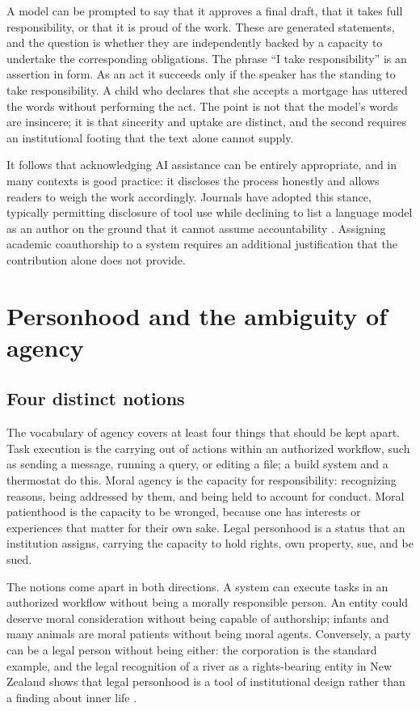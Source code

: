 \documentclass[11pt]{article}
\begin{document}
A model can be prompted to say that it approves a final draft, that it takes full responsibility, or that it is proud of the work. These are generated statements, and the question is whether they are independently backed by a capacity to undertake the corresponding obligations. The phrase ``I take responsibility'' is an assertion in form. As an act it succeeds only if the speaker has the standing to take responsibility. A child who declares that she accepts a mortgage has uttered the words without performing the act. The point is not that the model's words are insincere; it is that sincerity and uptake are distinct, and the second requires an institutional footing that the text alone cannot supply.

It follows that acknowledging AI assistance can be entirely appropriate, and in many contexts is good practice: it discloses the process honestly and allows readers to weigh the work accordingly. Journals have adopted this stance, typically permitting disclosure of tool use while declining to list a language model as an author on the ground that it cannot assume accountability \cite{nature2023,cope2023}. Assigning academic coauthorship to a system requires an additional justification that the contribution alone does not provide.

\section{Personhood and the ambiguity of agency}

\subsection{Four distinct notions}

The vocabulary of agency covers at least four things that should be kept apart. Task execution is the carrying out of actions within an authorized workflow, such as sending a message, running a query, or editing a file; a build system and a thermostat do this. Moral agency is the capacity for responsibility: recognizing reasons, being addressed by them, and being held to account for conduct. Moral patienthood is the capacity to be wronged, because one has interests or experiences that matter for their own sake. Legal personhood is a status that an institution assigns, carrying the capacity to hold rights, own property, sue, and be sued.

The notions come apart in both directions. A system can execute tasks in an authorized workflow without being a morally responsible person. An entity could deserve moral consideration without being capable of authorship; infants and many animals are moral patients without being moral agents. Conversely, a party can be a legal person without being either: the corporation is the standard example, and the legal recognition of a river as a rights-bearing entity in New Zealand shows that legal personhood is a tool of institutional design rather than a finding about inner life \cite{teawa2017}.
\end{document}
